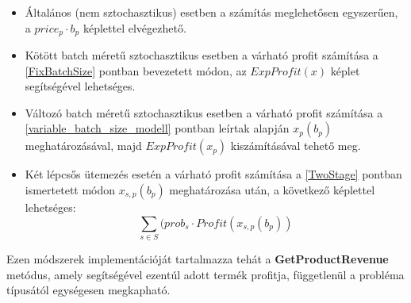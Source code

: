 \begin{itemize}
\item Általános (nem sztochasztikus) esetben a számítás meglehetősen egyszerűen, a $price_p \cdot b_p$ képlettel elvégezhető.
\item Kötött batch méretű sztochasztikus esetben a várható profit számítása a \ref{FixBatchSize} pontban bevezetett módon, az $ExpProfit(x)$ képlet segítségével lehetséges.
\item Változó batch méretű sztochasztikus esetben a várható profit számítása a \ref{variable_batch_size_modell} pontban leírtak alapján $x_p(b_p)$ meghatározásával, majd $ExpProfit(x_p)$ kiszámításával tehető meg.
\item Két lépcsős ütemezés esetén a várható profit számítása a \ref{TwoStage} pontban ismertetett módon $x_{s,p}(b_p)$  meghatározása után, a következő képlettel lehetséges:
$$ \sum_{s \in S}(prob_s \cdot Profit(x_{s,p}(b_p))$$ 
\end{itemize}
Ezen módszerek implementációját tartalmazza tehát a \textbf{GetProductRevenue} metódus, amely segítségével ezentúl adott termék profitja, függetlenül a probléma típusától egységesen megkapható.

